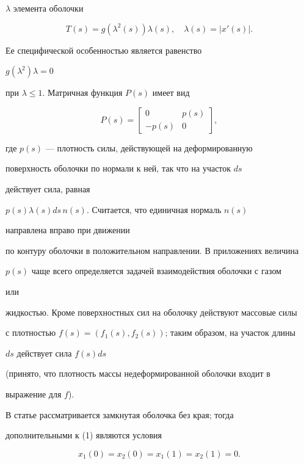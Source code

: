 $\lambda$ элемента оболочки 


$$ 


T(s)=g(\lambda^2(s))\lambda(s),\quad \lambda(s)=|x'(s)|. 


$$ 


Ее специфической особенностью является равенство 


$g(\lambda^2)\lambda=0$ 


при $\lambda\le 1$. Матричная функция $P(s)$ имеет вид 


$$ 


P(s)= 


\begin{bmatrix} 


0 & p(s) \\ -p(s) & 0 


\end{bmatrix} 


, 


$$ 


где $p(s)$ --- плотность силы, действующей на деформированную 


поверхность оболочки по нормали к ней, так что на участок $ds$ 


действует сила, равная 


$p(s)\lambda(s)ds\,n(s)$. Считается, что единичная нормаль $n(s)$ 


направлена вправо при движении 


по контуру оболочки в положительном направлении. В приложениях величина 


$p(s)$ чаще всего определяется задачей взаимодействия оболочки с газом


или 


жидкостью. Кроме поверхностных сил на оболочку действуют массовые силы 


с плотностью $f(s)=(f_1(s),f_2(s))$; таким образом, на участок длины 


$ds$ действует сила $f(s)ds$ 


(принято, что плотность массы недеформированной оболочки входит в 


выражение для $f$). 


 


В статье рассматривается замкнутая оболочка без края; тогда 


дополнительными к (1) являются условия 


\begin{equation} 


x_1(0)=x_2(0)=x_1(1)=x_2(1)=0. 


\end{equation} 


